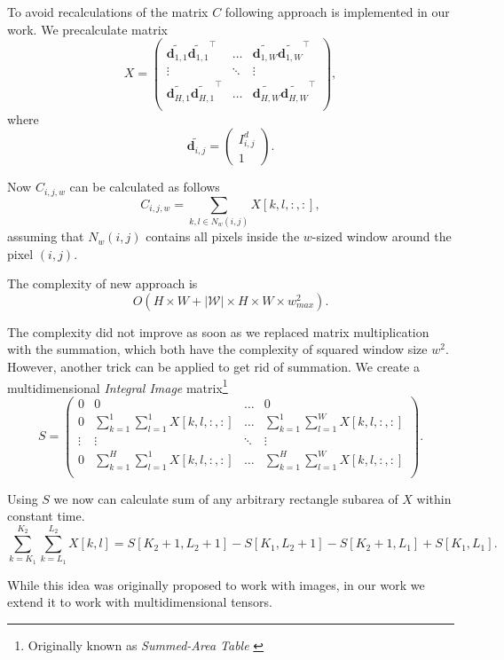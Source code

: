 To avoid recalculations of the matrix $C$ following approach is implemented in our work. We precalculate matrix
\[
X = 
\begin{pmatrix}
\tilde{\bm{d}_{1,1}} \tilde{\bm{d}_{1,1}}^\top & \dots & \tilde{\bm{d}_{1,W}} \tilde{\bm{d}_{1,W}}^\top \\
\vdots & \ddots & \vdots \\
\tilde{\bm{d}_{H,1}} \tilde{\bm{d}_{H,1}}^\top & \dots & \tilde{\bm{d}_{H,W}} \tilde{\bm{d}_{H,W}}^\top \\
\end{pmatrix},
\]
where
\[
\tilde{\bm{d}_{i,j}} = \begin{pmatrix}
I^d_{i,j} \\
1
\end{pmatrix}.
\]

Now $C_{i,j,w}$ can be calculated as follows
\[
C_{i,j,w} = \sum_{k, l \in N_w(i, j)} X[k,l,:,:],
\label{eq:sum}
\]
assuming that $N_w(i, j)$ contains all pixels inside the $w$-sized window around the pixel $(i, j)$.

The complexity of new approach is 
\[
O\left(H \times W + \left|\mathcal{W}\right| \times H \times W \times w_{max} ^ 2\right).
\]

The complexity did not improve as soon as we replaced matrix multiplication with the summation, which both have the complexity of squared window size $w^2$. However, another trick can be applied to get rid of summation. We create a multidimensional \textit{Integral Image} matrix\footnote{Originally known as \textit{Summed-Area Table} \cite{integral-image}}
\[
S = 
\begin{pmatrix}
0 & 0 & \dots & 0 \\
0 & \sum_{k=1}^1 \sum_{l=1}^1 X[k,l,:,:] & \dots & \sum_{k=1}^1 \sum_{l = 1}^W X[k,l,:,:] \\
\vdots & \vdots & \ddots & \vdots \\
0 & \sum_{k=1}^H \sum_{l=1}^1 X[k,l,:,:] & \dots & \sum_{k=1}^H \sum_{l=1}^W X[k,l,:,:] \\
\end{pmatrix}.
\]

Using $S$ we now can calculate sum of any arbitrary rectangle subarea of $X$ within constant time.
\begin{equation} \label{eq:sum_ii}
\sum_{k=K_1}^{K_2} \sum_{k=L_1}^{L_2} X[k,l] = S[K_2+1, L_2+1] - S[K_1, L_2+1] - S[K_2+1, L_1] + S[K_1, L_1].
\end{equation}

While this idea was originally proposed to work with images, in our work we extend it to work with multidimensional tensors.


